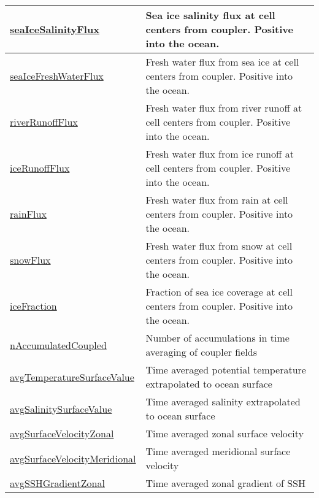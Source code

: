 {\begin{center}
\begin{longtable}{| p{2.0in} | p{4.0in} |}
    \hline
    \hyperref[subsec:var_sec_forcing_seaIceSalinityFlux]{seaIceSalinityFlux} & Sea ice salinity flux at cell centers from coupler. Positive into the ocean. \\
    \hline
    \hyperref[subsec:var_sec_forcing_seaIceFreshWaterFlux]{seaIceFreshWaterFlux} & Fresh water flux from sea ice at cell centers from coupler. Positive into the ocean. \\
    \hline
    \hyperref[subsec:var_sec_forcing_riverRunoffFlux]{riverRunoffFlux} & Fresh water flux from river runoff at cell centers from coupler. Positive into the ocean. \\
    \hline
    \hyperref[subsec:var_sec_forcing_iceRunoffFlux]{iceRunoffFlux} & Fresh water flux from ice runoff at cell centers from coupler. Positive into the ocean. \\
    \hline
    \hyperref[subsec:var_sec_forcing_rainFlux]{rainFlux} & Fresh water flux from rain at cell centers from coupler. Positive into the ocean. \\
    \hline
    \hyperref[subsec:var_sec_forcing_snowFlux]{snowFlux} & Fresh water flux from snow at cell centers from coupler. Positive into the ocean. \\
    \hline
    \hyperref[subsec:var_sec_forcing_iceFraction]{iceFraction} & Fraction of sea ice coverage at cell centers from coupler. Positive into the ocean. \\
    \hline
    \hyperref[subsec:var_sec_forcing_nAccumulatedCoupled]{nAccumulatedCoupled} & Number of accumulations in time averaging of coupler fields \\
    \hline
    \hyperref[subsec:var_sec_forcing_avgTemperatureSurfaceValue]{avgTemperatureSurfaceValue} & Time averaged potential temperature extrapolated to ocean surface \\
    \hline
    \hyperref[subsec:var_sec_forcing_avgSalinitySurfaceValue]{avgSalinitySurfaceValue} & Time averaged salinity extrapolated to ocean surface \\
    \hline
    \hyperref[subsec:var_sec_forcing_avgSurfaceVelocityZonal]{avgSurfaceVelocityZonal} & Time averaged zonal surface velocity \\
    \hline
    \hyperref[subsec:var_sec_forcing_avgSurfaceVelocityMeridional]{avgSurfaceVelocityMeridional} & Time averaged meridional surface velocity \\
    \hline
    \hyperref[subsec:var_sec_forcing_avgSSHGradientZonal]{avgSSHGradientZonal} & Time averaged zonal gradient of SSH \\

\end{longtable}
\end{center}}
